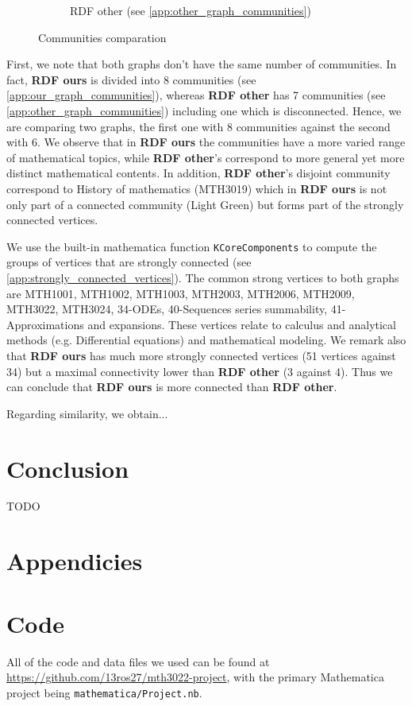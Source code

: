 \documentclass[english, 12pt]{article}
\begin{document}
\begin{figure}[H]
\begin{subfigure}[b]{0.45\textwidth}
        \caption{RDF other (see \ref{app:other_graph_communities})}
    \end{subfigure}
    \vspace{.5cm}
    \caption{Communities comparation}
    \label{fig:communities_comp}
\end{figure}


First, we note that both graphs don't have the same number of communities. In fact, {\bf RDF ours} is divided into 8 communities (see \ref{app:our_graph_communities}), whereas {\bf RDF other} has 7 communities (see \ref{app:other_graph_communities}) including one which is disconnected. Hence, we are comparing two graphs, the first one with 8 communities against the second with 6. We observe that in {\bf RDF ours} the communities have a more varied range of mathematical topics, while {\bf RDF other}'s correspond to more general yet more distinct mathematical contents.
In addition, {\bf RDF other}'s disjoint community correspond to History of mathematics (MTH3019) which in {\bf RDF ours} is not only part of a connected community (Light Green) but forms part of the strongly connected vertices.

We use the built-in mathematica function \texttt{KCoreComponents} to compute the groups of vertices that are strongly connected (see \ref{app:strongly_connected_vertices}). The common strong vertices to both graphs are MTH1001, MTH1002, MTH1003, MTH2003, MTH2006, MTH2009, MTH3022, MTH3024, 34-ODEs, 40-Sequences series summability, 41-Approximations and expansions. These vertices relate to calculus and analytical methods (e.g. Differential equations) and mathematical modeling.
We remark also that {\bf RDF ours} has much more strongly connected vertices (51 vertices against 34) but a maximal connectivity lower than {\bf RDF other} (3 against 4). Thus we can conclude that {\bf RDF ours} is more connected than {\bf RDF other}.

{\color{red} Regarding similarity, we obtain...}

\section{Conclusion}
{\color{red} TODO}


\printbibliography
\section*{Appendicies}
\parskip=0.0pt
\appendix
\section{Code}
All of the code and data files we used can be found at \url{https://github.com/13ros27/mth3022-project}, with the primary Mathematica project being \texttt{mathematica/Project.nb}.
\end{document}
